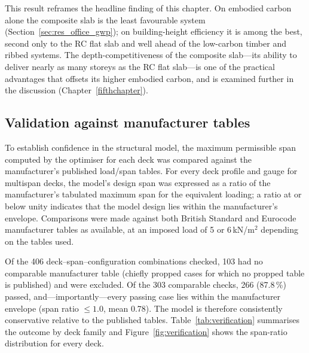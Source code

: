 This result reframes the headline finding of this chapter. On embodied carbon alone the composite slab is the least favourable system (Section~\ref{sec:res_office_gwp}); on building-height efficiency it is among the best, second only to the RC flat slab and well ahead of the low-carbon timber and ribbed systems. The depth-competitiveness of the composite slab---its ability to deliver nearly as many storeys as the RC flat slab---is one of the practical advantages that offsets its higher embodied carbon, and is examined further in the discussion (Chapter~\ref{fifthchapter}).

\subsection{Validation against manufacturer tables}
\label{sec:res_validation}
To establish confidence in the structural model, the maximum permissible span computed by the optimiser for each deck was compared against the manufacturer's published load/span tables. For every deck profile and gauge for multispan decks, the model's design span was expressed as a ratio of the manufacturer's tabulated maximum span for the equivalent loading; a ratio at or below unity indicates that the model design lies within the manufacturer's envelope. Comparisons were made against both British Standard and Eurocode manufacturer tables as available, at an imposed load of 5 or 6\,kN/m$^2$ depending on the tables used.

Of the 406 deck--span--configuration combinations checked, 103 had no comparable manufacturer table (chiefly propped cases for which no propped table is published) and were excluded. Of the 303 comparable checks, 266 (87.8\,\%) passed, and---importantly---every passing case lies within the manufacturer envelope (span ratio $\leq 1.0$, mean 0.78). The model is therefore consistently conservative relative to the published tables. Table~\ref{tab:verification} summarises the outcome by deck family and Figure~\ref{fig:verification} shows the span-ratio distribution for every deck.


